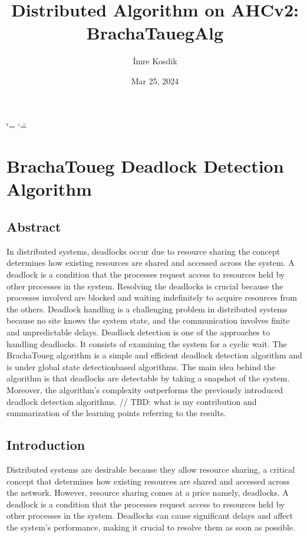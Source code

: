 \documentclass[letterpaper,10pt,english]{sphinxmanual}
\title{Distributed Algorithm on AHCv2: BrachaTauegAlg}
\date{Mar 25, 2024}
\author{İmre Kosdik}
\begin{document}
\ifdefined\shorthandoff
  \ifnum\catcode`\=\string=\active\shorthandoff{=}\fi
  \ifnum\catcode`\"=\active{}\fi
\fi

\pagestyle{empty}
\sphinxmaketitle
\pagestyle{plain}
\sphinxtableofcontents
\pagestyle{normal}
\label{\detokenize{index::doc}}


\sphinxstepscope


\chapter{Bracha\sphinxhyphen{}Toueg Deadlock Detection Algorithm}
\label{\detokenize{docs/BrachaTouegAlg/BrachaTouegAlg:brachatouegalg}}\label{\detokenize{docs/BrachaTouegAlg/BrachaTouegAlg::doc}}
\sphinxstepscope


\section{Abstract}
\label{\detokenize{docs/BrachaTouegAlg/abstract:abstract}}\label{\detokenize{docs/BrachaTouegAlg/abstract::doc}}
\sphinxAtStartPar
In distributed systems, deadlocks occur due to resource sharing \sphinxhyphen{} the concept determines how existing resources are shared and accessed across the system. A deadlock is a condition that the processes request access to resources held by other processes in the system. Resolving the deadlocks is crucial because the processes involved are blocked and waiting indefinitely to acquire resources from the others. Deadlock handling is a challenging problem in distributed systems because no site knows the system state, and the communication involves finite and unpredictable delays. Deadlock detection is one of the approaches to handling deadlocks. It consists of examining the system for a cyclic wait. The Bracha\sphinxhyphen{}Toueg algorithm is a simple and efficient deadlock detection algorithm and is under global state detection\sphinxhyphen{}based algorithms. The main idea behind the algorithm is that deadlocks are detectable by taking a snapshot of the system. Moreover, the algorithm’s complexity outperforms the previously introduced deadlock detection algorithms. // TBD: what is my contribution and summarization of the learning points referring to the results.

\sphinxstepscope


\section{Introduction}
\label{\detokenize{docs/BrachaTouegAlg/introduction:introduction}}\label{\detokenize{docs/BrachaTouegAlg/introduction::doc}}
\sphinxAtStartPar
Distributed systems are desirable because they allow resource sharing, a critical concept that determines how existing resources are shared and accessed across the network. However, resource sharing comes at a price \sphinxhyphen{} namely, deadlocks. A deadlock is a condition that the processes request access to resources held by other processes in the system. Deadlocks can cause significant delays and affect the system’s performance, making it crucial to resolve them as soon as possible.
\end{document}

